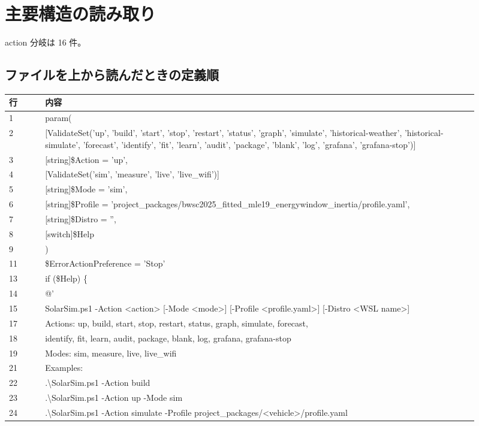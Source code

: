 \documentclass[a4paper,11pt]{article}
\begin{document}
        \section{主要構造の読み取り}
        action 分岐は 16 件。



        \subsection{ファイルを上から読んだときの定義順}
            \begin{longtable}{p{0.07\linewidth} p{0.84\linewidth}}
            \toprule
            行 & 内容 \\
            \midrule
            1 & param( \\
2 & [ValidateSet('up', 'build', 'start', 'stop', 'restart', 'status', 'graph', 'simulate', 'historical-weather', 'historical-simulate', 'forecast', 'identify', 'fit', 'learn', 'audit', 'package', 'blank', 'log', 'grafana', 'grafana-stop')] \\
3 & [string]\$Action = 'up', \\
4 & [ValidateSet('sim', 'measure', 'live', 'live\_wifi')] \\
5 & [string]\$Mode = 'sim', \\
6 & [string]\$Profile = 'project\_packages/bwsc2025\_fitted\_mle19\_energywindow\_inertia/profile.yaml', \\
7 & [string]\$Distro = '', \\
8 & [switch]\$Help \\
9 & ) \\
11 & \$ErrorActionPreference = 'Stop' \\
13 & if (\$Help) \{ \\
14 & @' \\
15 & SolarSim.ps1 -Action <action> [-Mode <mode>] [-Profile <profile.yaml>] [-Distro <WSL name>] \\
17 & Actions: up, build, start, stop, restart, status, graph, simulate, forecast, \\
18 & identify, fit, learn, audit, package, blank, log, grafana, grafana-stop \\
19 & Modes:   sim, measure, live, live\_wifi \\
21 & Examples: \\
22 & .\textbackslash{}SolarSim.ps1 -Action build \\
23 & .\textbackslash{}SolarSim.ps1 -Action up -Mode sim \\
24 & .\textbackslash{}SolarSim.ps1 -Action simulate -Profile project\_packages/<vehicle>/profile.yaml \\

\end{longtable}
\end{document}
